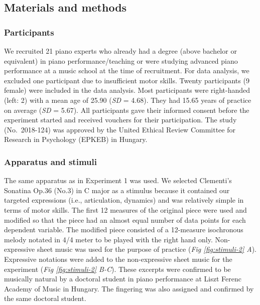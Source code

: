 \documentclass[
  english,
  man,floatsintext]{apa6}
\begin{document}
\hypertarget{materials-and-methods-1}{%
\subsection{Materials and methods}\label{materials-and-methods-1}}

\hypertarget{participants-1}{%
\subsubsection{Participants}\label{participants-1}}

We recruited 21 piano experts who already had a degree (above bachelor or equivalent) in piano performance/teaching or were studying advanced piano performance at a music school at the time of recruitment. For data analysis, we excluded one participant due to insufficient motor skills. Twenty participants (9 female) were included in the data analysis. Most participants were right-handed (left: 2) with a mean age of 25.90 (\emph{SD} = 4.68). They had 15.65 years of practice on average (\emph{SD} = 5.67). All participants gave their informed consent before the experiment started and received vouchers for their participation. The study (No.~2018-124) was approved by the United Ethical Review Committee for Research in Psychology (EPKEB) in Hungary.

\hypertarget{apparatus-and-stimuli-1}{%
\subsubsection{Apparatus and stimuli}\label{apparatus-and-stimuli-1}}

The same apparatus as in Experiment 1 was used. We selected Clementi's Sonatina Op.36 (No.3) in C major as a stimulus because it contained our targeted expressions (i.e., articulation, dynamics) and was relatively simple in terms of motor skills. The first 12 measures of the original piece were used and modified so that the piece had an almost equal number of data points for each dependent variable. The modified piece consisted of a 12-measure isochronous melody notated in 4/4 meter to be played with the right hand only. Non-expressive sheet music was used for the purpose of practice (\emph{Fig \ref{fig:stimuli-2} A}). Expressive notations were added to the non-expressive sheet music for the experiment (\emph{Fig \ref{fig:stimuli-2} B-C}). These excerpts were confirmed to be musically natural by a doctoral student in piano performance at Liszt Ferenc Academy of Music in Hungary. The fingering was also assigned and confirmed by the same doctoral student.
\end{document}
